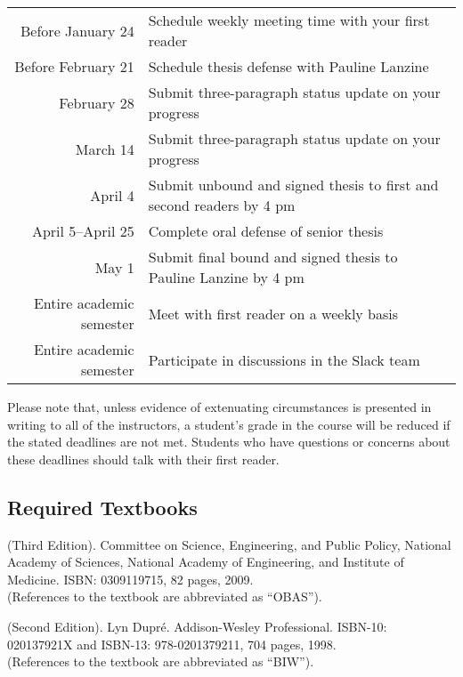 \documentclass[11pt]{article}
\begin{document}
\begin{center}
\begin{tabular}{r|l}
\hline

Before January 24  & Schedule weekly meeting time with your first reader \\
Before February 21 & Schedule thesis defense with Pauline Lanzine \\
February 28        & Submit three-paragraph status update on your progress \\
March 14           & Submit three-paragraph status update on your progress \\
April 4            & Submit unbound and signed thesis to first and second readers by 4 pm \\
April 5--April 25  & Complete oral defense of senior thesis \\
May 1              & Submit final bound and signed thesis to Pauline Lanzine by 4 pm\\

\hline
Entire academic semester & Meet with first reader on a weekly basis \\
Entire academic semester & Participate in discussions in the Slack team \\
\hline
\end{tabular}
\end{center}

\vspace*{-.25in}

\noindent Please note that, unless evidence of extenuating circumstances is
presented in writing to all of the instructors, a student's grade in the course
will be reduced if the stated deadlines are not met. Students who have questions
or concerns about these deadlines should talk with their first reader.

\subsection*{Required Textbooks}

(Third Edition).  Committee on Science, Engineering, and Public Policy, National
Academy of Sciences, National Academy of Engineering, and Institute of Medicine.
ISBN: 0309119715, 82 pages, 2009.\\ (References to the textbook are abbreviated
as ``OBAS'').

 (Second
Edition). Lyn Dupr\'e.  Addison-Wesley Professional.  ISBN-10: 020137921X and
ISBN-13: 978-0201379211, 704 pages, 1998.\\ (References to the textbook are
abbreviated as ``BIW'').
\end{document}
